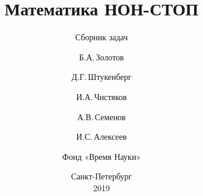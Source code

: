 \subject{\large\textrm{При поддержке Фонда Президентских грантов}
	\vspace{1in}}

\title{\fontsize{25}{25}\selectfont
	Математика НОН-СТОП}
\subtitle{\fontsize{18}{18}\selectfont
	Сборник задач
	\vspace{0.7in}}

\author{Б.А.\,Золотов \and Д.Г.\,Штукенберг \\
	\and И.А.\,Чистяков \and А.В.\,Семенов \and И.С.\,Алексеев \\
	\and Фонд «Время Науки»
	\vspace{1in}}

\date{Санкт-Петербург \\ 2019}